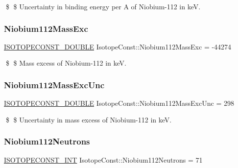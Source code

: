 \$ \$ Uncertainty in binding energy per A of Niobium-\/112 in keV. \mbox{\label{group___isotope_const-_niobium-_nb112_gac75bae23891ebbcb8072b0b0d0af546f}} 
\subsubsection{\texorpdfstring{Niobium112\+Mass\+Exc}{Niobium112MassExc}}
{\footnotesize\ttfamily \mbox{\hyperlink{group___isotope_const-_macros_ga8f45a7272ce02c0b4c65c44636ed719a}{I\+S\+O\+T\+O\+P\+E\+C\+O\+N\+S\+T\+\_\+\+D\+O\+U\+B\+LE}} Isotope\+Const\+::\+Niobium112\+Mass\+Exc = -\/44274}

\$ \$ Mass excess of Niobium-\/112 in keV. \mbox{\label{group___isotope_const-_niobium-_nb112_ga366752cdfbcd4cf9f9936d592781718d}} 
\subsubsection{\texorpdfstring{Niobium112\+Mass\+Exc\+Unc}{Niobium112MassExcUnc}}
{\footnotesize\ttfamily \mbox{\hyperlink{group___isotope_const-_macros_ga8f45a7272ce02c0b4c65c44636ed719a}{I\+S\+O\+T\+O\+P\+E\+C\+O\+N\+S\+T\+\_\+\+D\+O\+U\+B\+LE}} Isotope\+Const\+::\+Niobium112\+Mass\+Exc\+Unc = 298}

\$ \$ Uncertainty in mass excess of Niobium-\/112 in keV. \mbox{\label{group___isotope_const-_niobium-_nb112_ga12b7d29a07bc2ecd879ed9b3eb1e83b5}} 
\subsubsection{\texorpdfstring{Niobium112\+Neutrons}{Niobium112Neutrons}}
{\footnotesize\ttfamily \mbox{\hyperlink{group___isotope_const-_macros_ga5f18360b3e99483a35c32d789e62621c}{I\+S\+O\+T\+O\+P\+E\+C\+O\+N\+S\+T\+\_\+\+I\+NT}} Isotope\+Const\+::\+Niobium112\+Neutrons = 71}

